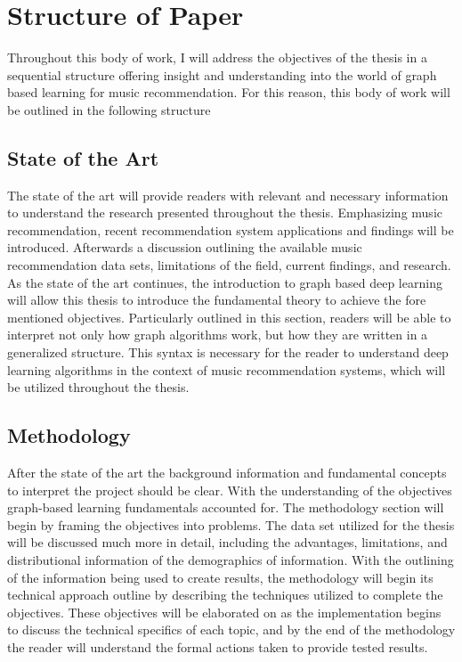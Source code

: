 \section{Structure of Paper}

Throughout this body of work, I will address the objectives of the thesis in a sequential structure offering insight and understanding into the world of graph based learning for music recommendation. For this reason, this body of work will be outlined in the following structure

\subsection{State of the Art}

The state of the art will provide readers with relevant and necessary information to understand the research presented throughout the thesis. Emphasizing music recommendation, recent recommendation system applications and findings will be introduced. Afterwards a discussion outlining the available music recommendation data sets, limitations of the field, current findings, and research. As the state of the art continues, the introduction to graph based deep learning will allow this thesis to introduce the fundamental theory to achieve the fore mentioned objectives. Particularly outlined in this section, readers will be able to interpret not only how graph algorithms work, but how they are written in a generalized structure. This syntax is necessary for the reader to understand deep learning algorithms in the context of music recommendation systems, which will be utilized throughout the thesis.

\subsection{Methodology}
After the state of the art the background information and fundamental concepts to interpret the project should be clear. With the understanding of the objectives graph-based learning fundamentals accounted for. The methodology section will begin by framing the objectives into problems. The data set utilized for the thesis will be discussed much more in detail, including the advantages, limitations, and distributional information of the demographics of information. With the outlining of the information being used to create results, the methodology will begin its technical approach outline by describing the techniques utilized to complete the objectives. These objectives will be elaborated on as the implementation begins to discuss the technical specifics of each topic, and by the end of the methodology the reader will understand the formal actions taken to provide tested results.

